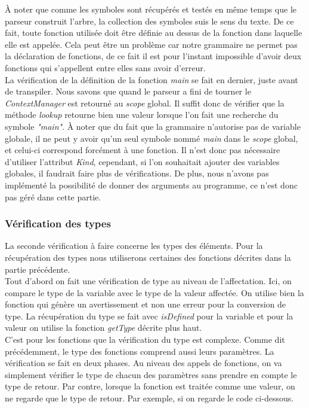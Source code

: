 \documentclass[a4paper]{article}%
\begin{document}
À noter que comme les symboles sont récupérés et testés en même temps que le
parseur construit l'arbre, la collection des symboles suis le sens du texte. De
ce fait, toute fonction utilisée doit être définie au dessus de la fonction dans
laquelle elle est appelée. Cela peut être un problème car notre grammaire ne
permet pas la déclaration de fonctions, de ce fait il est pour l'instant
impossible d'avoir deux fonctions qui s'appellent entre elles sans avoir
d'erreur.\\

La vérification de la définition de la fonction \textit{main} se fait en
dernier, juste avant de transpiler. Nous savons que quand le parseur a fini de
tourner le \textit{ContextManager} est retourné au \textit{scope} global. Il
suffit donc de vérifier que la méthode \textit{lookup} retourne bien une valeur
lorsque l'on fait une recherche du symbole \textit{"main"}. À noter que du fait
que la grammaire n'autorise pas de variable globale, il ne peut y avoir qu'un
seul symbole nommé \textit{main} dans le \textit{scope} global, et celui-ci
correspond forcément à une fonction. Il n'est donc pas nécessaire d'utiliser
l'attribut \textit{Kind}, cependant, si l'on souhaitait ajouter des variables
globales, il faudrait faire plus de vérifications. De plus, nous n'avons pas
implémenté la possibilité de donner des arguments au programme, ce n'est donc
pas géré dans cette partie.

\subsubsection*{Vérification des types}

La seconde vérification à faire concerne les types des éléments. Pour la
récupération des types nous utiliserons certaines des fonctions décrites dans la
partie précédente.\\

Tout d'abord on fait une vérification de type au niveau de l'affectation.
Ici, on compare le type de la variable avec le type de la valeur affectée. On
utilise bien la fonction qui génère un avertissement et non une erreur pour la
conversion de type. La récupération du type se fait avec \textit{isDefined}
pour la variable et pour la valeur on utilise la fonction \textit{getType}
décrite plus haut.\\

C'est pour les fonctions que la vérification du type est complexe. Comme dit
précédemment, le type des fonctions comprend aussi leurs paramètres. La
vérification se fait en deux phases. Au niveau des appels de fonctions, on va
simplement vérifier le type de chacun des paramètres sans prendre en compte le
type de retour. Par contre, lorsque la fonction est traitée comme une valeur, on
ne regarde que le type de retour. Par exemple, si on regarde le code ci-dessous.
\end{document}
